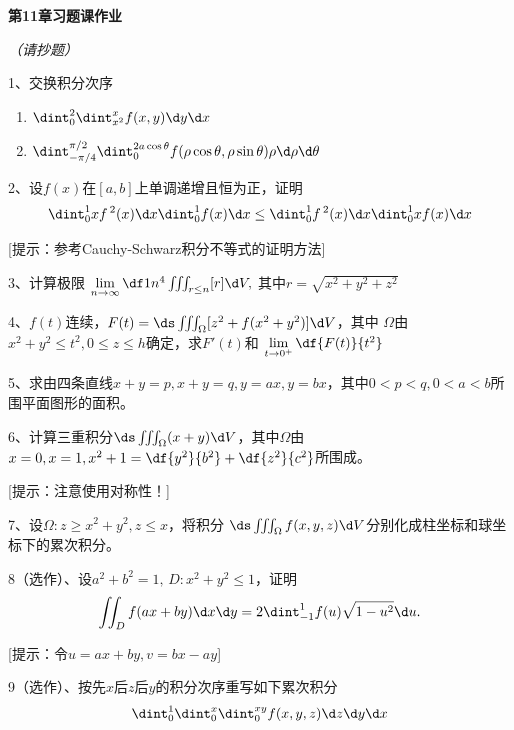 
\newpage

{\Large\bf 第11章习题课作业}

{\it （请抄题）}

1、交换积分次序
 \begin{enumerate}[(1)]
    \setlength{\itemindent}{1cm}
    \item $\dint_0^2\dint_{x^2}^xf(x,y)\d y\d x$
    \item $\dint_{-\pi/4}^{\pi/2}\dint_0^{2a\cos\theta}
    f(\rho\cos\theta,\rho\sin\theta)\rho\d\rho\d\theta$
 \end{enumerate}
 
2、设$f(x)$在$[a,b]$上单调递增且恒为正，证明
	$${\dint_0^1xf\,^2(x)\d x}{\dint_0^1f(x)\d x}\leq
	{\dint_0^1f\,^2(x)\d x}{\dint_0^1xf(x)\d x}$$

[提示：参考Cauchy-Schwarz积分不等式的证明方法]
	
3、计算极限
	$\lim\limits_{n\to\infty}\df 1{n^4}\iiint_{r\leq n}[r]\d V,$
	其中$r=\sqrt{x^2+y^2+z^2}$
	
4、$f(t)$连续，$F(t)=\ds\iiint_{\Omega}[z^2+f(x^2+y^2)]\d V$，其中
	$\Omega$由$x^2+y^2\leq t^2,0\leq z\leq h$确定，求$F'(t)$和
	$\lim\limits_{t\to 0^+}\df{F(t)}{t^2}$

5、求由四条直线$x+y=p,x+y=q,y=ax,y=bx$，其中$0<p<q,0<a<b$所围平面图形的面积。

6、计算三重积分$\ds\iiint_{\Omega}(x+y)\d V$，其中$\Omega$由
$x=0,x=1,x^2+1=\df{y^2}{b^2}+\df{z^2}{c^2}$所围成。

[提示：注意使用对称性！]

7、设$\Omega:z\geq x^2+y^2,z\leq x$，将积分
$\ds\iiint_{\Omega}f(x,y,z)\d V$分别化成柱坐标和球坐标下的累次积分。

% 

8（选作）、设$a^2+b^2=1,\, D:x^2+y^2\leq 1$，证明
$$\iint_Df(ax+by)\d x\d y=2\dint_{-1}^1f(u)\sqrt{1-u^2}\d u.$$

[提示：令$u=ax+by,v=bx-ay$]

9（选作）、按先$x$后$z$后$y$的积分次序重写如下累次积分
$$\dint_0^1\dint_0^x\dint_0^{xy}f(x,y,z)\d z\d y\d x$$

